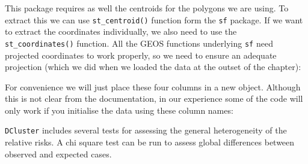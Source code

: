 \documentclass[
  krantz2]{krantz}
\makeatletter
\newenvironment{Shaded}{\begin{snugshade}}{\end{snugshade}}
\newcommand{\AttributeTok}[1]{\textcolor[rgb]{0.61,0.61,0.61}{#1}}
\newcommand{\CommentTok}[1]{\textcolor[rgb]{0.37,0.37,0.37}{\textit{#1}}}
\newcommand{\DecValTok}[1]{\textcolor[rgb]{0.06,0.06,0.06}{#1}}
\newcommand{\FunctionTok}[1]{\textcolor[rgb]{0,0,0}{#1}}
\newcommand{\NormalTok}[1]{#1}
\newcommand{\OtherTok}[1]{\textcolor[rgb]{0.37,0.37,0.37}{#1}}
\newcommand{\SpecialCharTok}[1]{\textcolor[rgb]{0,0,0}{#1}}
\newenvironment{kframe}{%
\medskip{}
\setlength{\fboxsep}{.8em}
 \def\at@end@of@kframe{}%
 \ifinner\ifhmode%
  \def\at@end@of@kframe{\end{minipage}}%
  \begin{minipage}{\columnwidth}%
 \fi\fi%
 \def\FrameCommand##1{\hskip\@totalleftmargin \hskip-\fboxsep
 \colorbox{shadecolor}{##1}\hskip-\fboxsep
     \hskip-\linewidth \hskip-\@totalleftmargin \hskip\columnwidth}%
 \MakeFramed {\advance\hsize-\width
   \@totalleftmargin\z@ \linewidth\hsize
   \@setminipage}}%
 {\par\unskip\endMakeFramed%
 \at@end@of@kframe}
\renewenvironment{Shaded}{\begin{kframe}}{\end{kframe}}
\makeatother
\begin{document}
This package requires as well the centroids for the polygons we are using. To extract this we can use \texttt{st\_centroid()} function form the \texttt{sf} package. If we want to extract the coordinates individually, we also need to use the \texttt{st\_coordinates()} function. All the GEOS functions underlying \texttt{sf} need projected coordinates to work properly, so we need to ensure an adequate projection (which we did when we loaded the data at the outset of the chapter):

\begin{Shaded}
\end{Shaded}

For convenience we will just place these four columns in a new object. Although this is not clear from the documentation, in our experience some of the code will only work if you initialise the data using these column names:

\begin{Shaded}
\end{Shaded}

\texttt{DCluster} includes several tests for assessing the general heterogeneity of the relative risks. A chi square test can be run to assess global differences between observed and expected cases.
\end{document}
